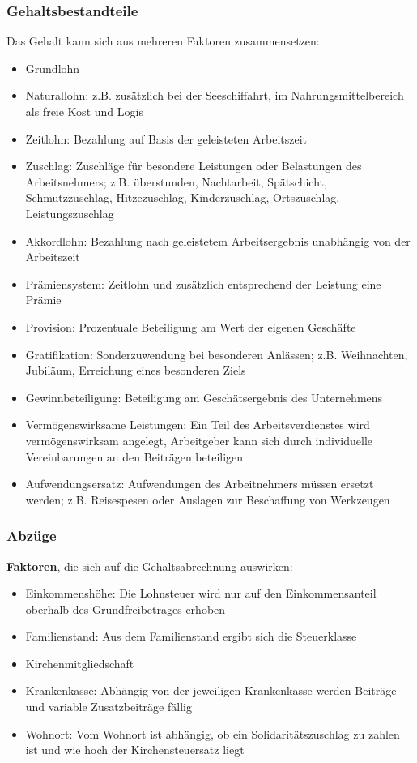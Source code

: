 \subsubsection{Gehaltsbestandteile} 
Das Gehalt kann sich aus mehreren Faktoren zusammensetzen:
\begin{itemize}
\setlength\itemsep{0em}
	\item Grundlohn
	\item Naturallohn: z.B. zusätzlich bei der Seeschiffahrt, im Nahrungsmittelbereich als \ql freie Kost und Logis\qr\
	\item Zeitlohn: Bezahlung auf Basis der geleisteten Arbeitszeit
	\item Zuschlag: Zuschläge für besondere Leistungen oder Belastungen des Arbeitsnehmers; z.B. überstunden, Nachtarbeit, Spätschicht, Schmutzzuschlag, Hitzezuschlag, Kinderzuschlag, Ortszuschlag, Leistungszuschlag
	\item Akkordlohn: Bezahlung nach geleistetem Arbeitsergebnis unabhängig von der Arbeitszeit
	\item Prämiensystem: Zeitlohn und zusätzlich entsprechend der Leistung eine Prämie
	\item Provision: Prozentuale Beteiligung am Wert der eigenen Geschäfte
	\item Gratifikation: Sonderzuwendung bei besonderen Anlässen; z.B. Weihnachten, Jubiläum, Erreichung eines besonderen Ziels
	\item Gewinnbeteiligung: Beteiligung am Geschätsergebnis des Unternehmens
	\item Vermögenswirksame Leistungen: Ein Teil des Arbeitsverdienstes wird vermögenswirksam angelegt, Arbeitgeber kann sich durch individuelle Vereinbarungen an den Beiträgen beteiligen
	\item Aufwendungsersatz: Aufwendungen des Arbeitnehmers müssen ersetzt werden; z.B. Reisespesen oder Auslagen zur Beschaffung von Werkzeugen
\end{itemize}

\subsubsection{Abzüge}
{\bf Faktoren}, die sich auf die Gehaltsabrechnung auswirken:
\begin{itemize}
\setlength\itemsep{0em}
	\item Einkommenshöhe: Die Lohnsteuer wird nur auf den Einkommensanteil oberhalb des Grundfreibetrages erhoben
	\item Familienstand: Aus dem Familienstand ergibt sich die Steuerklasse
	\item Kirchenmitgliedschaft
	\item Krankenkasse: Abhängig von der jeweiligen Krankenkasse werden Beiträge und variable Zusatzbeiträge fällig
	\item Wohnort: Vom Wohnort ist abhängig, ob ein Solidaritätszuschlag zu zahlen ist und wie hoch der Kirchensteuersatz liegt
\end{itemize}

